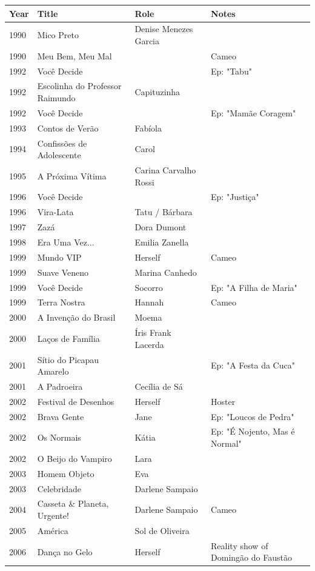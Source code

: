 \documentclass{article}
\begin{document}
\begin{tabular}{llll}
\toprule
Year & Title & Role & Notes \\
\midrule
1990 & Mico Preto & Denise Menezes Garcia &  \\
1990 & Meu Bem, Meu Mal &  & Cameo \\
1992 & Você Decide &  & Ep: "Tabu" \\
1992 & Escolinha do Professor Raimundo & Capituzinha &  \\
1992 & Você Decide &  & Ep: "Mamãe Coragem" \\
1993 & Contos de Verão & Fabíola &  \\
1994 & Confissões de Adolescente & Carol &  \\
1995 & A Próxima Vítima & Carina Carvalho Rossi &  \\
1996 & Você Decide &  & Ep: "Justiça" \\
1996 & Vira-Lata & Tatu / Bárbara &  \\
1997 & Zazá & Dora Dumont &  \\
1998 & Era Uma Vez... & Emilia Zanella &  \\
1999 & Mundo VIP & Herself & Cameo \\
1999 & Suave Veneno & Marina Canhedo &  \\
1999 & Você Decide & Socorro & Ep: "A Filha de Maria" \\
1999 & Terra Nostra & Hannah & Cameo \\
2000 & A Invenção do Brasil & Moema &  \\
2000 & Laços de Família & Íris Frank Lacerda &  \\
2001 & Sítio do Picapau Amarelo &  & Ep: "A Festa da Cuca" \\
2001 & A Padroeira & Cecília de Sá &  \\
2002 & Festival de Desenhos & Herself & Hoster \\
2002 & Brava Gente & Jane & Ep: "Loucos de Pedra" \\
2002 & Os Normais & Kátia & Ep: "É Nojento, Mas é Normal" \\
2002 & O Beijo do Vampiro & Lara &  \\
2003 & Homem Objeto & Eva &  \\
2003 & Celebridade & Darlene Sampaio &  \\
2004 & Casseta \& Planeta, Urgente! & Darlene Sampaio & Cameo \\
2005 & América & Sol de Oliveira &  \\
2006 & Dança no Gelo & Herself & Reality show of Domingão do Faustão \\

\end{tabular}
\end{document}
